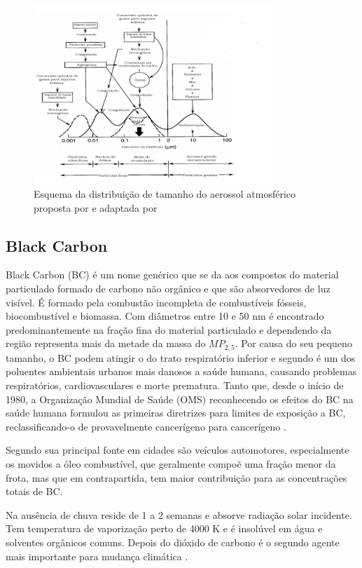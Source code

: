 \newpage
\begin{figure}[H]
  \centering
  \includegraphics[width=0.8\textwidth]{../inputs/images/modas_aerossol.png}
  \caption{Esquema da distribuição de tamanho do aerossol atmosférico proposta
           por \citet{finlayson1999} e adaptada por \citet{oliveira2007} 
           \label{fig:modas_aerossol}}
\end{figure}

\subsection{Black Carbon}

Black Carbon (BC) é um nome genérico que se da aos compostos do material 
particulado formado de carbono não orgânico e que são absorvedores de luz
visível. É formado pela combustão incompleta de combustíveis fósseis, 
biocombustível e biomassa.
Com diâmetros entre 10 e 50 nm é encontrado predominantemente na fração fina 
do material particulado e dependendo da região representa mais da metade 
da massa do $MP_{2,5}$. Por causa do seu pequeno tamanho, o BC podem atingir o
do trato respiratório inferior e segundo \citet{jacobson2014} é um dos poluentes
ambientais urbanos mais danosos a saúde humana, causando problemas respiratórios, 
cardiovasculares e morte prematura. Tanto que, desde o início de 1980, 
a Organização Mundial de Saúde (OMS) reconhecendo os efeitos do BC na saúde 
humana formulou as primeiras diretrizes para limites de exposição a BC, 
reclassificando-o de provavelmente cancerígeno para cancerígeno
\citep{scovronick2015}.

Segundo \cite{petzold2013} sua principal fonte em cidades são veículos 
automotores, especialmente os movidos a óleo combustível, que geralmente 
compoẽ uma fração menor da frota, mas que em contrapartida, tem maior 
contribuição para as concentrações totais de BC. 

Na ausência de chuva reside de 1 a 2 semanas e absorve radiação solar incidente.
Tem temperatura de vaporização perto de 4000 K e é insolúvel em água e 
solventes orgânicos comuns. Depois do dióxido de carbono é o segundo 
agente mais importante para mudança climática \citep{bond2013}.

